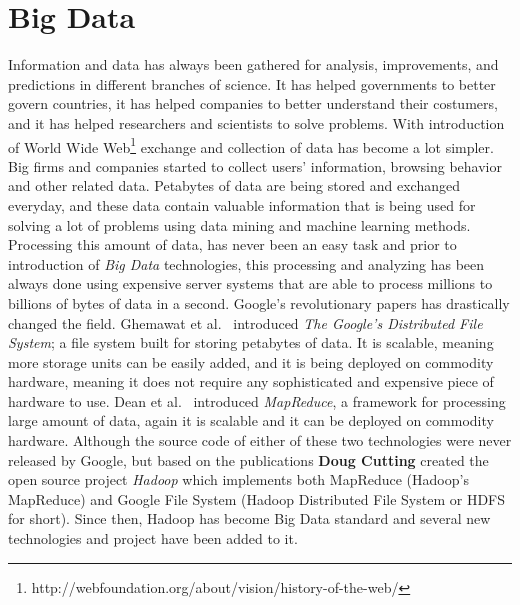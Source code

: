 \documentclass[english]{tktltiki}
\begin{document}
\section{Big Data}
\label{sec:bigdata}
Information and data has always been gathered for analysis, improvements, and predictions in different branches of science. 
It has helped governments to better govern countries, it has helped companies to better understand their costumers, and it has helped researchers and scientists to solve problems. 
With introduction of World Wide Web\footnote{http://webfoundation.org/about/vision/history-of-the-web/} exchange and collection of data has become a lot simpler. 
Big firms and companies started to collect users' information, browsing behavior and other related data. 
Petabytes of data are being stored and exchanged everyday, and these data contain valuable information that is being used for solving a lot of problems using data mining and machine learning methods. 
Processing this amount of data, has never been an easy task and prior to introduction of \textit{Big Data} technologies, this processing and analyzing has been always done using expensive server systems that are able to process millions to billions of bytes of data in a second. 
Google's revolutionary papers has drastically changed the field. 
Ghemawat et al.\ \cite{ghemawat03} introduced \textit{The Google's Distributed File System}; a file system built for storing petabytes of data. 
It is scalable, meaning more storage units can be easily added, and it is being deployed on commodity hardware, meaning it does not require any sophisticated and expensive piece of hardware to use. 
Dean et al.\ \cite{dean04} introduced \textit{MapReduce}, a framework for processing large amount of data, again it is scalable and it can be deployed on commodity hardware. 
Although the source code of either of these two technologies were never released by Google, but based on the publications \textbf{Doug Cutting} created the open source project \textit{Hadoop} which implements both MapReduce (Hadoop's MapReduce) and Google File System (Hadoop Distributed File System or HDFS for short). 
Since then, Hadoop has become Big Data standard and several new technologies and project have been added to it.
\end{document}
